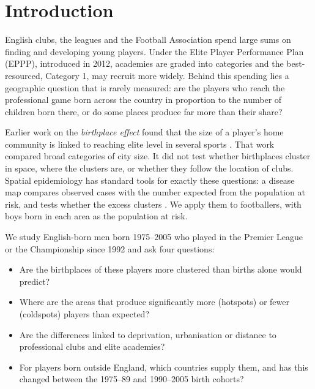 \section{Introduction}

English clubs, the leagues and the Football Association spend large sums on finding and developing young players. Under the Elite Player Performance Plan (EPPP), introduced in 2012, academies are graded into categories and the best-resourced, Category 1, may recruit more widely. Behind this spending lies a geographic question that is rarely measured: are the players who reach the professional game born across the country in proportion to the number of children born there, or do some places produce far more than their share?

Earlier work on the \emph{birthplace effect} found that the size of a player's home community is linked to reaching elite level in several sports \cite{cote2006,macdonald2009}. That work compared broad categories of city size. It did not test whether birthplaces cluster in space, where the clusters are, or whether they follow the location of clubs. Spatial epidemiology has standard tools for exactly these questions: a disease map compares observed cases with the number expected from the population at risk, and tests whether the excess clusters \cite{marshall1991,assuncao1999,getis1992,anselin1995}. We apply them to footballers, with boys born in each area as the population at risk.

We study English-born men born 1975--2005 who played in the Premier League or the Championship since 1992 and ask four questions:
\begin{itemize}
  \item[\textbf{RQ1}] Are the birthplaces of these players more clustered than births alone would predict?
  \item[\textbf{RQ2}] Where are the areas that produce significantly more (hotspots) or fewer (coldspots) players than expected?
  \item[\textbf{RQ3}] Are the differences linked to deprivation, urbanisation or distance to professional clubs and elite academies?
  \item[\textbf{RQ4}] For players born outside England, which countries supply them, and has this changed between the 1975--89 and 1990--2005 birth cohorts?
\end{itemize}

